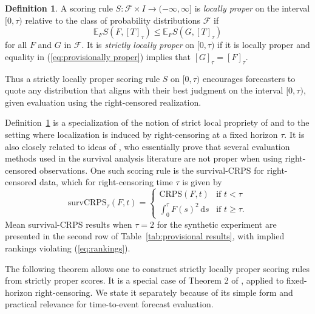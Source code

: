 \documentclass[10pt]{article} %
\theoremstyle{theorem}
\theoremstyle{definition}
\newtheorem{defn}{Definition}
\newcommand{\EEE}{\mathbb{E}}
\newcommand{\dd}{\mathrm{d}}
\newcommand{\CRPS}{\mathrm{CRPS}}
\newcommand{\survCRPS}{\mathrm{survCRPS}}
\begin{document}
\begin{defn}\label{def:provisionally strictly proper}
A scoring rule $S:\mathcal{F}\times I\to(-\infty,\infty]$ is \textit{locally proper} on the interval $[0,\tau)$ relative to the class of probability distributions $\mathcal{F}$ if
\begin{equation}\label{eq:provisionally proper}
\EEE_F S(F, [T]_\tau) \leq \EEE_F S(G, [T]_\tau)
\end{equation}
for all $F$ and $G$ in $\mathcal{F}$. It is  \textit{strictly locally proper} on $[0,\tau)$ if it is locally proper and equality in (\ref{eq:provisionally proper}) implies that $[G]_\tau=[F]_\tau$.
\end{defn}

Thus a strictly locally proper scoring rule $S$ on $[0,\tau)$ encourages forecasters to quote any distribution that aligns with their best judgment on the interval $[0,\tau)$, given evaluation using the right-censored realization.

Definition~\ref{def:provisionally strictly proper} is a specialization of the notion of strict local propriety of \citet{holzmann2017focusing} and \citet[Definition~4]{de2025localizing} to the setting where localization is induced by right-censoring at a fixed horizon $\tau$. It is also closely related to ideas of \citet{rindt2022survival}, who essentially prove that several evaluation methods used in the survival analysis literature are not proper when using right-censored observations. One such scoring rule is the survival-CRPS \citep{avati2020countdown} for right-censored data, which for right-censoring time $\tau$ is given by
\begin{equation}\label{eq:survival CRPS}
\survCRPS_\tau(F, t)=
\begin{cases}
\CRPS(F,t) & \text{if } t<\tau \\
\displaystyle\int_0^\tau F(s)^2\,\dd s & \text{if } t\geq \tau.
\end{cases}
\end{equation}
Mean survival-CRPS results when $\tau=2$ for the synthetic experiment are presented in the second row of Table~\ref{tab:provisional results}, with implied rankings violating (\ref{eq:rankings}).

The following theorem allows one to construct strictly locally proper scoring rules from strictly proper scores. It is a special case of Theorem 2 of \citet{de2025localizing}, applied to fixed-horizon right-censoring. We state it separately because of its simple form and practical relevance for time-to-event forecast evaluation.
\end{document}
